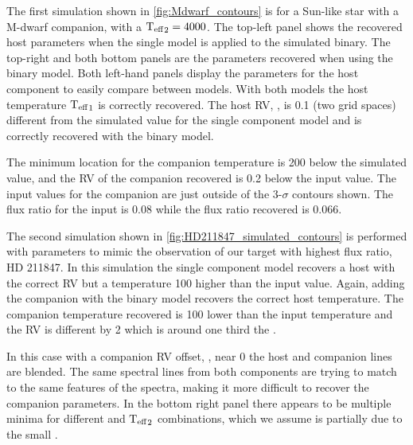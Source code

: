 The first simulation shown in \cref{fig:Mdwarf_contours} is for a Sun-like star with a M-dwarf companion, with a \({\textrm{T}_{\mathrm{eff}}}_{2} =4000\)\K{}.
The top-left panel shows the recovered host parameters when the single model is applied to the simulated binary.
The top-right and both bottom panels are the parameters recovered when using the binary model.
Both left-hand panels display the parameters for the host component to easily compare between models.
With both models the host temperature \({\textrm{T}_{\mathrm{eff}}}_{1}\) is correctly recovered.
The host {RV}, \Rvone{}, is 0.1\kmps{} (two grid spaces) different from the simulated value for the single component model and is correctly recovered with the binary model.

The minimum \textchisquared{} location for the companion temperature is 200\K{} below the simulated value, and the {RV} of the companion recovered is 0.2\kmps{} below the input value.
The input values for the companion are just outside of the 3-\(\sigma\) contours shown.
The flux ratio for the input is 0.08 while the flux ratio recovered is 0.066.

The second simulation shown in \cref{fig:HD211847_simulated_contours} is performed with parameters to mimic the observation of our target with highest flux ratio, {HD 211847}.
In this simulation the single component model recovers a host with the correct {RV} but a temperature 100\K{} higher than the input value.
Again, adding the companion with the binary model recovers the correct host temperature.
The companion temperature recovered is 100\K{} lower than the input temperature and the {RV} is different by 2\kmps{} which is around one third the {\fwhm}.

In this case with a companion {RV} offset, \Rvtwo{}, near 0\kmps{} the host and companion lines are blended.
The same spectral lines from both components are trying to match to the same features of the spectra, making it more difficult to recover the companion parameters.
In the bottom right panel there appears to be multiple minima for different \Rvtwo{} and \({\textrm{T}_{\mathrm{eff}}}_{2}\) combinations, which we assume is partially due to the small \Rvtwo{}.


